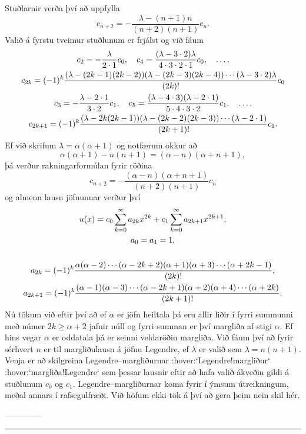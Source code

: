 Stuðlarnir verða því að uppfylla
$$
c_{n+2}=- \dfrac{\lambda-(n+1)n}{(n+2)(n+1)}c_n.
$$
Valið á fyrstu tveimur stuðlunum er frjálst og
við fáum
\begin{gather*}
c_2= -\dfrac{\lambda}{2\cdot 1}c_0, \quad
c_4= \dfrac{(\lambda-3\cdot 2)\lambda}{4\cdot 3\cdot 2\cdot
1}c_0,\quad \dots, \\
c_{2k}=(-1)\sp
k\dfrac{(\lambda-(2k-1)(2k-2))(\lambda-(2k-3)(2k-4))\cdots
(\lambda-3\cdot 2)\lambda}{(2k)!}c_0\\
c_3=- \dfrac{\lambda-2\cdot 1}{3\cdot 2}c_1, \quad
c_5= \dfrac{(\lambda-4\cdot 3)(\lambda-2\cdot 1)}{5\cdot 4\cdot 3\cdot 2}
c_1,\quad \dots,\\
c_{2k+1}=(-1)\sp
k\dfrac{(\lambda-2k(2k-1))(\lambda-(2k-2)(2k-3))\cdots
(\lambda-2\cdot 1)}{(2k+1)!}c_1.
\end{gather*}
Ef við skrifum $\lambda=\alpha(\alpha+1)$ og notfærum okkur að 
$$
\alpha(\alpha+1)-n(n+1)=(\alpha-n)(\alpha+n+1),
$$ 
þá verður rakningarformúlan fyrir röðina
$$c_{n+2}= -\dfrac{(\alpha-n)(\alpha+n+1)}{(n+2)(n+1)}c_n
$$
og almenn lausn jöfnunnar verður því 
\begin{gather*}
u(x) = c_0\sum\limits_{k=0}\sp\infty
a_{2k}
x\sp{2k}
+
c_1\sum\limits_{k=0}\sp\infty
a_{2k+1}
x\sp {2k+1},\\
a_0=a_1=1,\\
\\
a_{2k}= (-1)\sp k 
\dfrac{\alpha(\alpha-2)\cdots(\alpha-2k+2)
(\alpha+1)(\alpha+3)\cdots(\alpha+2k-1)}{(2k)!},\\
a_{2k+1}= (-1)\sp k 
\dfrac{(\alpha-1)(\alpha-3)\cdots(\alpha-2k+1)
(\alpha+2)(\alpha+4)\cdots(\alpha+2k)}{(2k+1)!}.
\end{gather*}
Nú tökum við eftir því að ef $\alpha$ er jöfn heiltala þá eru allir
liðir í fyrri summunni með númer $2k\geq \alpha+2$ jafnir núll og fyrri
summan er því margliða af stigi $\alpha$.  Ef hins vegar $\alpha$  er
oddatala þá er seinni veldaröðin margliða.  Við fáum því að fyrir
sérhvert $n$ er til margliðulausn á jöfnu
Legendre, ef $\lambda$ er
valið sem $\lambda=n(n+1)$. Venja er að skilgreina
{Legendre--margliðurnar} :hover:`Legendre!margliður` :hover:`margliða!Legendre`
sem þessar lausnir eftir að hafa valið ákveðin gildi á stuðlunum
$c_0$ og $c_1$.  Legendre--margliðurnar koma fyrir í ýmsum
útreikningum, meðal annars í rafsegulfræði.  Við höfum
ekki tök á því að gera þeim nein skil hér.


--------------



\bigskip\hrule\bigskip


